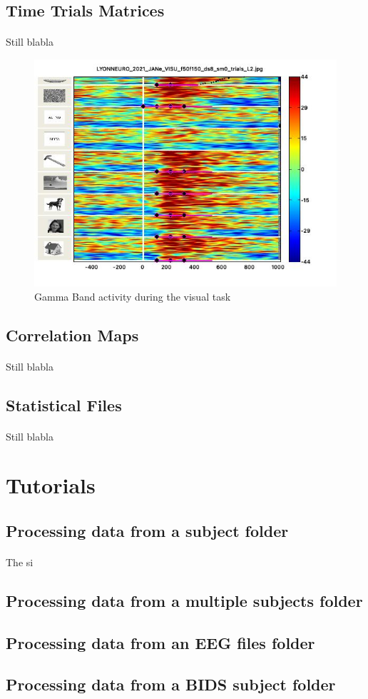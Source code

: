 \documentclass[a4paper]{article}
\begin{document}
\subsection{Time Trials Matrices}
\paragraph{} Still blabla
\begin{figure}[H]
\begin{center}
\includegraphics[scale=0.7]{TimeTrialsMatrice.jpg}
\end{center}
\caption{\label{TimeTrialsPicture}Gamma Band activity during the visual task}
\end{figure}
\subsection{Correlation Maps}
\paragraph{} Still blabla
\subsection{Statistical Files}
\paragraph{} Still blabla
\section{Tutorials} \label{tutorials}    
\subsection{Processing data from a subject folder}
\paragraph{} The si
\subsection{Processing data from a multiple subjects folder}
\subsection{Processing data from an EEG files folder}
\subsection{Processing data from a BIDS subject folder}
\end{document}
